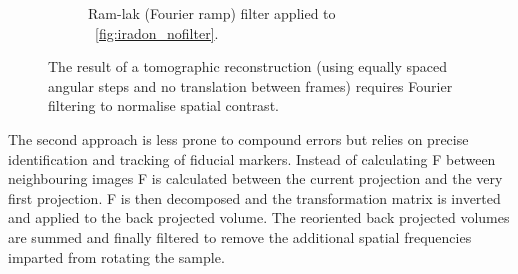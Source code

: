 \begin{figure}
\begin{subfigure}[t]{0.3\textwidth}
    \caption[Filtered iRadon]{Ram-lak (Fourier ramp) filter applied to \figurename~\ref{fig:iradon_nofilter}.}
    \label{fig:iradon_filter}
  \end{subfigure}
    \hfill
    \label{fig:irandons}
  \caption{The result of a tomographic reconstruction (using equally spaced angular steps and no translation between frames) requires Fourier filtering to normalise spatial contrast.}\label{fig:irandons}%
\end{figure}

The second approach is less prone to compound errors but relies on precise identification and tracking of fiducial markers.
Instead of calculating \gls{F} between neighbouring images \gls{F} is calculated between the current projection and the very first projection.
\gls{F} is then decomposed and the transformation matrix is inverted and applied to the back projected volume.
The reoriented back projected volumes are summed and finally filtered to remove the additional spatial frequencies imparted from rotating the sample.


